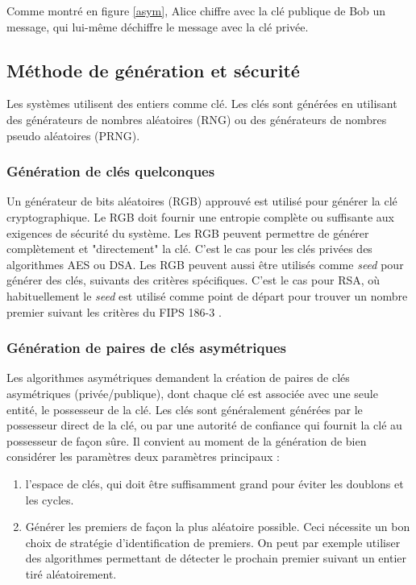 Comme montré en figure \ref{asym}, Alice chiffre avec la clé publique de Bob un message, qui lui-même déchiffre le message avec la clé privée.

\subsection{Méthode de génération et sécurité}


Les systèmes utilisent des entiers comme clé. Les clés sont générées en utilisant des générateurs de nombres aléatoires (RNG) ou des générateurs de nombres pseudo aléatoires (PRNG). 

\subsubsection{Génération de clés quelconques}
Un générateur de bits aléatoires (RGB) approuvé est utilisé pour générer la clé cryptographique. Le RGB doit fournir une entropie complète ou suffisante aux exigences de sécurité du système. Les RGB peuvent  permettre de générer complètement et "directement" la clé. C'est le cas pour les clés privées des algorithmes AES ou DSA.
Les RGB peuvent aussi être utilisés comme \textit{seed} pour générer des clés, suivants des critères spécifiques. C'est le cas pour RSA, où habituellement le \textit{seed} est utilisé comme point de départ pour trouver un nombre premier suivant les critères du FIPS 186-3 \cite{fips186-3}.

\subsubsection{Génération de paires de clés asymétriques}
Les algorithmes asymétriques demandent la création de paires de clés asymétriques (privée/publique), dont chaque clé est associée avec une seule entité, le possesseur de la clé. Les clés sont généralement générées par le possesseur direct de la clé, ou par une autorité de confiance qui fournit la clé au possesseur de façon sûre.
Il convient au moment de la génération de bien considérer les paramètres deux paramètres principaux : 
\begin{enumerate}
\item l'espace de clés, qui doit être suffisamment grand pour éviter les doublons et les cycles.
\item Générer les premiers de façon la plus aléatoire possible. Ceci nécessite un bon choix de stratégie d'identification de premiers. On peut par exemple utiliser des algorithmes permettant de détecter le prochain premier suivant un entier tiré aléatoirement. 
\end{enumerate}


